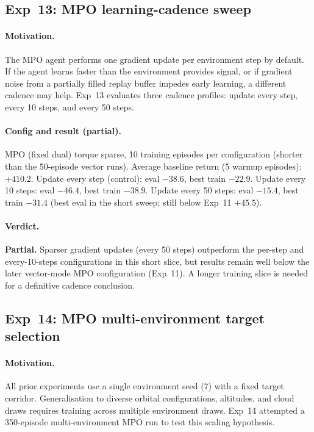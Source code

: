 \subsection{Exp~13: MPO learning-cadence sweep}
\label{sec:exp13}

\paragraph{Motivation.}
The MPO agent performs one gradient update per environment step by default.
If the agent learns faster than the environment provides signal, or if gradient noise from a partially
filled replay buffer impedes early learning, a different cadence may help.
Exp~13 evaluates three cadence profiles: update every step, every 10 steps, and every 50 steps.

\paragraph{Config and result (partial).}
MPO (fixed dual) torque sparse, 10 training episodes per configuration (shorter than the 50-episode vector runs).
Average baseline return (5 warmup episodes): $+410.2$.
Update every step (control): eval $-38.6$, best train $-22.9$.
Update every 10 steps: eval $-46.4$, best train $-38.9$.
Update every 50 steps: eval $-15.4$, best train $-31.4$ (best eval in the short sweep; still below Exp~11 $+45.5$).

\paragraph{Verdict.}
\textbf{Partial.}
Sparser gradient updates (every 50 steps) outperform the per-step and every-10-steps configurations in this short slice,
but results remain well below the later vector-mode MPO configuration (Exp~11).
A longer training slice is needed for a definitive cadence conclusion.

\subsection{Exp~14: MPO multi-environment target selection}
\label{sec:exp14}

\paragraph{Motivation.}
All prior experiments use a single environment seed (7) with a fixed target corridor.
Generalisation to diverse orbital configurations, altitudes, and cloud draws requires
training across multiple environment draws.
Exp~14 attempted a 350-episode multi-environment MPO run to test this scaling hypothesis.

